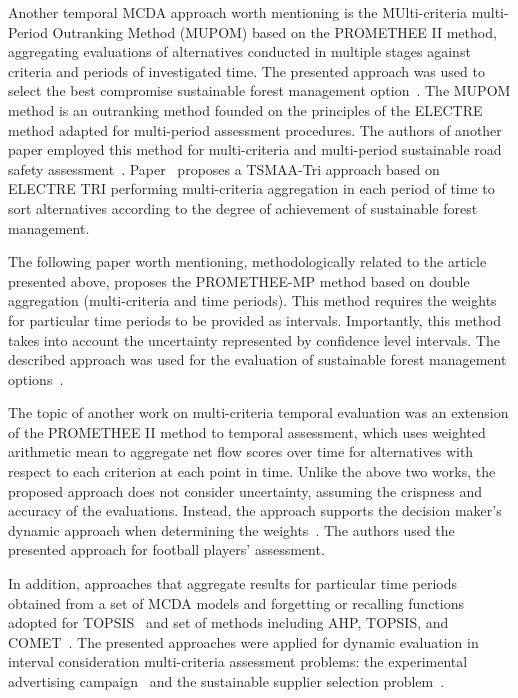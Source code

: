 \documentclass[final,5p,times,twocolumn,authoryear]{elsarticle}
\begin{document}
Another temporal MCDA approach worth mentioning is the MUlti-criteria multi-Period Outranking Method (MUPOM) based on the PROMETHEE II method, aggregating evaluations of alternatives conducted in multiple stages against criteria and periods of investigated time. The presented approach was used to select the best compromise sustainable forest management option~\citep{frini2019mupom}. The MUPOM method is an outranking method founded on the principles of the ELECTRE method adapted for multi-period assessment procedures. The authors of another paper employed this method for multi-criteria and multi-period sustainable road safety assessment~\citep{martins2021multidimensional}. Paper~\citep{mouhib2021tsmaa} proposes a TSMAA-Tri approach based on ELECTRE TRI performing multi-criteria aggregation in each period of time to sort alternatives according to the degree of achievement of sustainable forest management.

The following paper worth mentioning, methodologically related to the article presented above, proposes the PROMETHEE-MP method based on double aggregation (multi-criteria and time periods). This method requires the weights for particular time periods to be provided as intervals. Importantly, this method takes into account the uncertainty represented by confidence level intervals. The described approach was used for the evaluation of sustainable forest management options~\citep{urli2019promethee}.

The topic of another work on multi-criteria temporal evaluation was an extension of the PROMETHEE II method to temporal assessment, which uses weighted arithmetic mean to aggregate net flow scores over time for alternatives with respect to each criterion at each point in time. Unlike the above two works, the proposed approach does not consider uncertainty, assuming the crispness and accuracy of the evaluations. Instead, the approach supports the decision maker's dynamic approach when determining the weights~\citep{banamar2018extension}. The authors used the presented approach for football players' assessment.

In addition, approaches that aggregate results for particular time periods obtained from a set of MCDA models and forgetting or recalling functions adopted for TOPSIS~\citep{watrobski2016multistage} and set of methods including AHP, TOPSIS, and COMET~\citep{karczmarczyk2018comparative}. The presented approaches were applied for dynamic evaluation in interval consideration multi-criteria assessment problems: the experimental advertising campaign~\citep{watrobski2016multistage} and the sustainable supplier selection problem~\citep{karczmarczyk2018comparative, kizielewicz2021study}.
\end{document}
